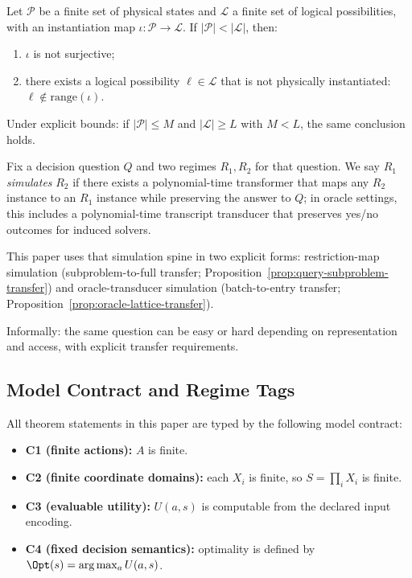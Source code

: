 \begin{theorem}\label{thm:physical-incompleteness}
Let $\mathcal{P}$ be a finite set of physical states and $\mathcal{L}$ a finite set of logical possibilities, with an instantiation map $\iota : \mathcal{P} \to \mathcal{L}$. If $|\mathcal{P}| < |\mathcal{L}|$, then:
\begin{enumerate}
\item $\iota$ is not surjective;
\item there exists a logical possibility $\ell \in \mathcal{L}$ that is not physically instantiated: $\ell \notin \mathrm{range}(\iota)$.
\end{enumerate}
Under explicit bounds: if $|\mathcal{P}| \le M$ and $|\mathcal{L}| \ge L$ with $M < L$, the same conclusion holds.
\end{theorem}

\begin{definition}\label{def:regime-simulation}
Fix a decision question $Q$ and two regimes $R_1,R_2$ for that question.
We say $R_1$ \emph{simulates} $R_2$ if there exists a polynomial-time transformer that maps any $R_2$ instance to an $R_1$ instance while preserving the answer to $Q$; in oracle settings, this includes a polynomial-time transcript transducer that preserves yes/no outcomes for induced solvers.
\end{definition}

This paper uses that simulation spine in two explicit forms: restriction-map simulation (subproblem-to-full transfer; Proposition~\ref{prop:query-subproblem-transfer}) and oracle-transducer simulation (batch-to-entry transfer; Proposition~\ref{prop:oracle-lattice-transfer}).

Informally: the same question can be easy or hard depending on representation and access, with explicit transfer requirements.

\subsection{Model Contract and Regime Tags}\label{sec:model-contract}

All theorem statements in this paper are typed by the following model contract:
\begin{itemize}
\item \textbf{C1 (finite actions):} $A$ is finite.
\item \textbf{C2 (finite coordinate domains):} each $X_i$ is finite, so $S=\prod_i X_i$ is finite.
\item \textbf{C3 (evaluable utility):} $U(a,s)$ is computable from the declared input encoding.
\item \textbf{C4 (fixed decision semantics):} optimality is defined by $\Opt(s)=\arg\max_a U(a,s)$.
\end{itemize}

